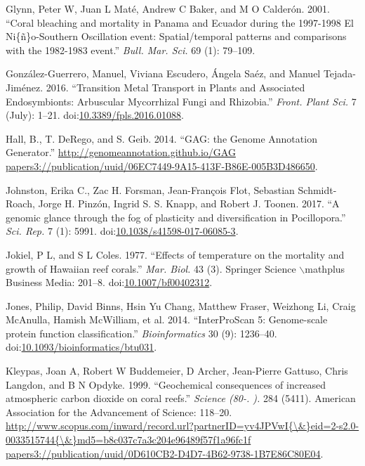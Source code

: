 \documentclass[]{elsarticle} %
\begin{document}
\hypertarget{ref-Glynn:2001p7571}{}
Glynn, Peter W, Juan L Maté, Andrew C Baker, and M O Calderón. 2001.
``Coral bleaching and mortality in Panama and Ecuador during the
1997-1998 El Ni\{ñ\}o-Southern Oscillation event: Spatial/temporal
patterns and comparisons with the 1982-1983 event.'' \emph{Bull. Mar.
Sci.} 69 (1): 79--109.

\hypertarget{ref-Gonzalez-Guerrero2016}{}
González-Guerrero, Manuel, Viviana Escudero, Ángela Saéz, and Manuel
Tejada-Jiménez. 2016. ``Transition Metal Transport in Plants and
Associated Endosymbionts: Arbuscular Mycorrhizal Fungi and Rhizobia.''
\emph{Front. Plant Sci.} 7 (July): 1--21.
doi:\href{https://doi.org/10.3389/fpls.2016.01088}{10.3389/fpls.2016.01088}.

\hypertarget{ref-Hall2014}{}
Hall, B., T. DeRego, and S. Geib. 2014. ``GAG: the Genome Annotation
Generator.''
\href{http://genomeannotation.github.io/GAG\%20papers3://publication/uuid/06EC7449-9A15-413F-B86E-005B3D486650}{http://genomeannotation.github.io/GAG papers3://publication/uuid/06EC7449-9A15-413F-B86E-005B3D486650}.

\hypertarget{ref-Johnston2017}{}
Johnston, Erika C., Zac H. Forsman, Jean-François Flot, Sebastian
Schmidt-Roach, Jorge H. Pinzón, Ingrid S. S. Knapp, and Robert J.
Toonen. 2017. ``A genomic glance through the fog of plasticity and
diversification in Pocillopora.'' \emph{Sci. Rep.} 7 (1): 5991.
doi:\href{https://doi.org/10.1038/s41598-017-06085-3}{10.1038/s41598-017-06085-3}.

\hypertarget{ref-Jokiel_1977}{}
Jokiel, P L, and S L Coles. 1977. ``Effects of temperature on the
mortality and growth of Hawaiian reef corals.'' \emph{Mar. Biol.} 43
(3). Springer Science \(\backslash\)mathplus Business Media: 201--8.
doi:\href{https://doi.org/10.1007/bf00402312}{10.1007/bf00402312}.

\hypertarget{ref-Jones2014a}{}
Jones, Philip, David Binns, Hsin Yu Chang, Matthew Fraser, Weizhong Li,
Craig McAnulla, Hamish McWilliam, et al. 2014. ``InterProScan 5:
Genome-scale protein function classification.'' \emph{Bioinformatics} 30
(9): 1236--40.
doi:\href{https://doi.org/10.1093/bioinformatics/btu031}{10.1093/bioinformatics/btu031}.

\hypertarget{ref-Kleypas1999}{}
Kleypas, Joan A, Robert W Buddemeier, D Archer, Jean-Pierre Gattuso,
Chris Langdon, and B N Opdyke. 1999. ``Geochemical consequences of
increased atmospheric carbon dioxide on coral reefs.'' \emph{Science
(80-. ).} 284 (5411). American Association for the Advancement of
Science: 118--20.
\href{http://www.scopus.com/inward/record.url?partnerID=yv4JPVwI\%7B/\&\%7Deid=2-s2.0-0033515744\%7B/\&\%7Dmd5=b8c037c7a3c204e96489f57f1a96fc1f\%20papers3://publication/uuid/0D610CB2-D4D7-4B62-9738-1B7E86C80E04}{http://www.scopus.com/inward/record.url?partnerID=yv4JPVwI\{\textbackslash{}\&\}eid=2-s2.0-0033515744\{\textbackslash{}\&\}md5=b8c037c7a3c204e96489f57f1a96fc1f papers3://publication/uuid/0D610CB2-D4D7-4B62-9738-1B7E86C80E04}.
\end{document}

